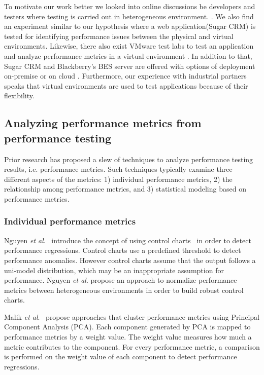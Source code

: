 \documentclass[smallextended]{svjour3}       %
\begin{document}
To motivate our work better we looked into online discussions be developers and testers where testing is carried out in heterogeneous environment. \cite{performanceonvvirtual}\cite{stackoverflow}\cite{windowsserver}. We also find an experiment similar to our hypothesis where a web application(Sugar CRM) is tested for identifying performance issues between the physical and virtual environments\cite{sugarcrmexp}. Likewise, there also exist VMware test labs to test an application and analyze performance metrics in a virtual environment \cite{vmware_test_lab}. In addition to that, Sugar CRM and Blackberry's BES server are offered with options of deployment on-premise or on cloud \cite{bbs} \cite{sugarcrm}. Furthermore, our experience with industrial partners speaks that virtual environments are used to test applications because of their flexibility.

\subsection{Analyzing performance metrics from performance testing} 

Prior research has proposed a slew of techniques to analyze performance testing results, i.e. performance metrics. Such techniques typically examine three different aspects of the metrics: 1) individual performance metrics, 2) the relationship among performance metrics, and 3) statistical modeling based on performance metrics.


\subsubsection{Individual performance metrics}
\label{sec:relatedindividual}
Nguyen \textit{et al$.$}~\cite{Nguyen:2012:ADP:2188286.2188344} introduce the concept of using control charts~\cite{shewhart1931economic} in order to detect performance regressions. Control charts use a predefined threshold to detect performance anomalies. However control charts assume that the output follows a uni-model distribution, which may be an inappropriate assumption for performance. Nguyen \textit{ et al$.$} propose an approach to normalize performance metrics between heterogeneous environments in order to build robust control charts. %

Malik \emph{et al$.$}~\cite{Malik:2010:ACL:1955601.1955936, haroon} propose approaches that cluster performance metrics using Principal Component Analysis (PCA). Each component generated by PCA is mapped to performance metrics by a weight value. The weight value measures how much a metric contributes to the component. For every performance metric, a comparison is performed on the weight value of each component to detect performance regressions.
\end{document}
